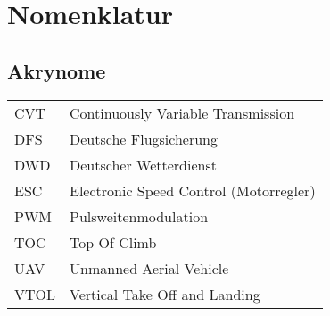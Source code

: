%
\chapter*{Nomenklatur}
%
%
\section*{Akrynome}
\begin{longtable}{lp{13cm}}
	CVT & Continuously Variable Transmission \\
	DFS & Deutsche Flugsicherung \\
	DWD & Deutscher Wetterdienst \\
	ESC & Electronic Speed Control (Motorregler)\\
	PWM & Pulsweitenmodulation\\
	TOC & Top Of Climb\\
	UAV & Unmanned Aerial Vehicle\\
	VTOL & Vertical Take Off and Landing
\end{longtable}
%
